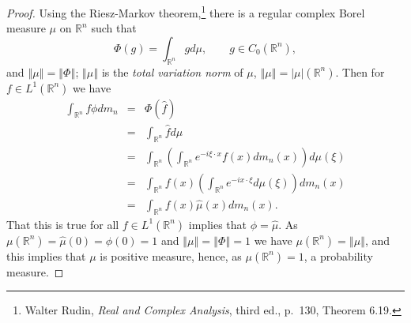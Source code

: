 \documentclass{article}
\newcommand{\norm}[1]{\left\Vert #1 \right\Vert}
\theoremstyle{definition}
\theoremstyle{definition}
\begin{document}
\begin{proof}
Using the Riesz-Markov theorem,\footnote{Walter Rudin, {\em Real and Complex Analysis}, third ed., p.~130, Theorem 6.19.}
there is a regular complex Borel measure $\mu$ on $\mathbb{R}^n$ such that
\[
\Phi(g) = \int_{\mathbb{R}^n} g d\mu, \qquad g \in C_0(\mathbb{R}^n),
\]
and $\norm{\mu}=\norm{\Phi}$; $\norm{\mu}$ is the {\em total variation norm} of $\mu$, $\norm{\mu}=|\mu|(\mathbb{R}^n)$.
Then for $f \in L^1(\mathbb{R}^n)$ we have
\begin{eqnarray*}
\int_{\mathbb{R}^n} f\phi dm_n&=&\Phi(\hat{f})\\
&=&\int_{\mathbb{R}^n} \hat{f} d\mu \\
&=&\int_{\mathbb{R}^n}\left( \int_{\mathbb{R}^n} e^{-i\xi\cdot x} f(x) dm_n(x) \right) d\mu(\xi)\\
&=&\int_{\mathbb{R}^n} f(x) \left( \int_{\mathbb{R}^n} e^{-ix\cdot \xi} d\mu(\xi) \right) dm_n(x)\\
&=&\int_{\mathbb{R}^n} f(x) \hat{\mu}(x) dm_n(x).
\end{eqnarray*}
That this is true for all $f \in L^1(\mathbb{R}^n)$ implies that $\phi=\hat{\mu}$.
As $\mu(\mathbb{R}^n)=\hat{\mu}(0)=\phi(0)=1$ and $\norm{\mu}=\norm{\Phi}=1$ we have $\mu(\mathbb{R}^n) = \norm{\mu}$, and this implies that
$\mu$ is positive measure, hence, as $\mu(\mathbb{R}^n)=1$, a probability measure.

\end{proof}
\end{document}

